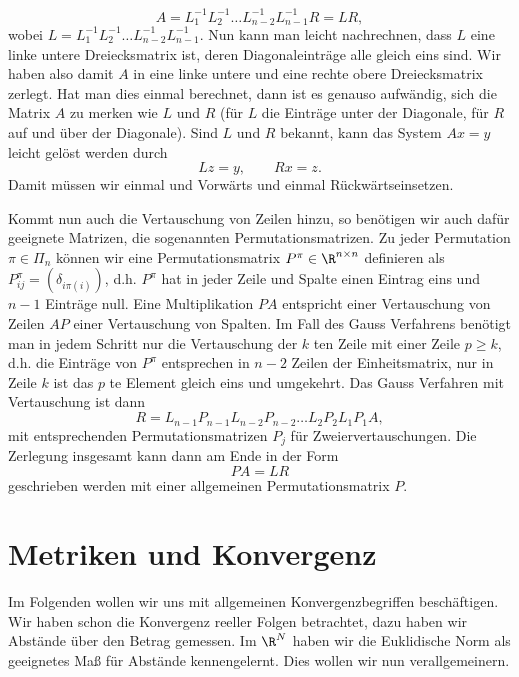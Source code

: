 \documentclass[letterpaper,10pt,english]{jupyterBook}
\begin{document}
\begin{equation*}
 A =  L_1^{-1}   L_2^{-1} \ldots  L_{n-2}^{-1} L_{n-1}^{-1} R  = L R,
\end{equation*}
wobei \(L= L_1^{-1}   L_2^{-1} \ldots  L_{n-2}^{-1} L_{n-1}^{-1}\). Nun kann man leicht nachrechnen, dass \(L\) eine linke untere Dreiecksmatrix ist, deren Diagonaleinträge alle gleich eins sind. Wir haben also damit \(A\) in eine linke untere und eine rechte obere Dreiecksmatrix zerlegt. Hat man dies einmal berechnet, dann ist es genauso aufwändig, sich die Matrix \(A\) zu merken wie \(L\) und \(R\) (für \(L\) die Einträge unter der Diagonale, für \(R\) auf und über der Diagonale). Sind \(L\) und \(R\) bekannt, kann das System \(Ax=y\) leicht gelöst werden durch
\begin{equation*}
 L z = y, \qquad Rx = z.
\end{equation*}
Damit müssen wir einmal und Vorwärts  und einmal Rückwärtseinsetzen.

Kommt nun auch die Vertauschung von Zeilen hinzu, so benötigen wir auch dafür geeignete Matrizen, die sogenannten Permutationsmatrizen. Zu jeder Permutation \(\pi \in \Pi_n\) können wir eine Permutationsmatrix \(P^\pi \in \R^{n \times n}\) definieren als \(P_{ij}^\pi = (\delta_{i\pi(i)})\), d.h. \(P^\pi\) hat in jeder Zeile und Spalte einen Eintrag eins und \(n-1\) Einträge null. Eine Multiplikation \(PA\) entspricht einer Vertauschung von Zeilen \(AP\) einer Vertauschung von Spalten. Im Fall des Gauss Verfahrens benötigt man in jedem Schritt nur die Vertauschung der \(k\) ten Zeile mit einer Zeile \(p \geq k\), d.h. die Einträge von \(P^\pi\) entsprechen in \(n-2\) Zeilen der Einheitsmatrix, nur in Zeile \(k\) ist das \(p\) te Element gleich eins und umgekehrt. Das Gauss Verfahren mit Vertauschung ist dann
\begin{equation*}
 R=L_{n-1} P_{n-1} L_{n-2} P_{n-2}\ldots L_2 P_2 L_1 P_1 A ,
\end{equation*}
mit entsprechenden Permutationsmatrizen \(P_j\) für Zweiervertauschungen. Die Zerlegung insgesamt kann dann am Ende in der Form
\begin{equation*}
 P A = L R
\end{equation*}
geschrieben werden mit einer allgemeinen Permutationsmatrix \(P\).


\chapter{Metriken und Konvergenz}
\label{\detokenize{metrik/metrik:metriken-und-konvergenz}}\label{\detokenize{metrik/metrik::doc}}
Im Folgenden wollen wir uns mit allgemeinen Konvergenzbegriffen beschäftigen. Wir haben schon die Konvergenz reeller Folgen betrachtet, dazu haben wir Abstände über den Betrag gemessen. Im \(\R^N\) haben wir die Euklidische Norm als geeignetes Maß für Abstände kennengelernt. Dies wollen wir nun verallgemeinern.
\end{document}
